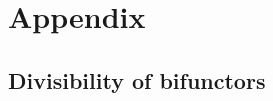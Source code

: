 \documentclass[main.tex]{subfiles}
\begin{document}
\appendix

\section{Appendix}

%
%
%
%
%
%
%
%
%
\subsection{Divisibility of bifunctors}
\label{sss:divisibility_of_bifunctors}
\end{document}
